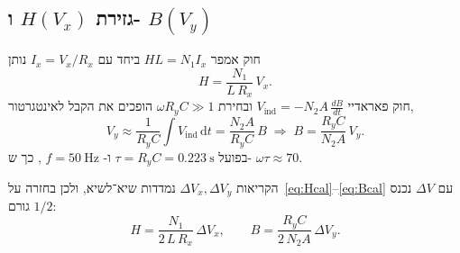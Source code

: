 \documentclass{extarticle}
\begin{document}
\subsection{\texorpdfstring{גזירת
$H(V_{x})$
ו-
$B(V_{y})$
}{גזירת
H(Vx)
ו-
B(Vy)}}
חוק אמפר
$HL=N_1 I_x$
ביחד עם
$I_x=V_x/R_x$
נותן
\begin{equation}\label{eq:Hcal}
H=\frac{N_{1}}{L\,R_{x}}\,V_{x}.
\end{equation}
חוק פאראדיי
$V_{\mathrm{ind}}=-N_2 A\,\frac{dB}{dt}$
ובחירת
$\omega R_yC\gg1$
הופכים את הקבל לאינטגרטור,
\begin{equation}\label{eq:Bcal}
V_{y}\approx\frac{1}{R_{y}C}\int V_{\mathrm{ind}}\,\mathrm{d}t=\frac{N_{2}A}{R_{y}C}\,B\;\Longrightarrow\;B=\frac{R_{y}C}{N_{2}A}\,V_{y}.
\end{equation}
בפועל
$\tau=R_yC=\SI{0.223}{\second}$
ו-
$f=\SI{50}{\hertz}$
, כך ש-
$\omega\tau\approx70$.

הקריאות
$\Delta V_x,\Delta V_y$
נמדדות שיא־לשיא, ולכן בחזרה על~\eqref{eq:Hcal}--\eqref{eq:Bcal} עם
$\Delta V$
נכנס גורם
$1/2$:
\begin{equation}\label{eq:HBpp}
H=\frac{N_{1}}{2\,L\,R_{x}}\,\Delta V_{x},\qquad B=\frac{R_{y}C}{2\,N_{2}A}\,\Delta V_{y}.
\end{equation}
\end{document}
